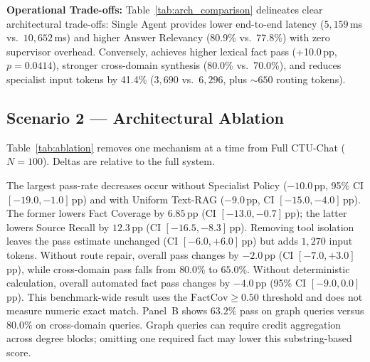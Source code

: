 \textbf{Operational Trade-offs:}
Table~\ref{tab:arch_comparison} delineates clear architectural trade-offs: Single Agent provides lower end-to-end latency ($5{,}159$\,ms vs.\ $10{,}652$\,ms) and higher Answer Relevancy (80.9\% vs.\ 77.8\%) with zero supervisor overhead. Conversely, \system{} achieves higher lexical fact pass (+10.0\,pp, $p{=}0.0414$), stronger cross-domain synthesis (80.0\% vs.\ 70.0\%), and reduces specialist input tokens by 41.4\% ($3{,}690$ vs.\ $6{,}296$, plus ${\sim}650$ routing tokens).

\subsection{Scenario 2 --- Architectural Ablation}
\label{sec:s2_results}

Table~\ref{tab:ablation} removes one mechanism at a time from Full CTU-Chat ($N{=}100$). Deltas are relative to the full system.

The largest pass-rate decreases occur without Specialist Policy ($-10.0$\,pp, 95\% CI $[-19.0, -1.0]$\,pp) and with Uniform Text-RAG ($-9.0$\,pp, CI $[-15.0, -4.0]$\,pp). The former lowers Fact Coverage by $6.85$\,pp (CI $[-13.0, -0.7]$\,pp); the latter lowers Source Recall by $12.3$\,pp (CI $[-16.5, -8.3]$\,pp). Removing tool isolation leaves the pass estimate unchanged (CI $[-6.0, +6.0]$\,pp) but adds $1{,}270$ input tokens. Without route repair, overall pass changes by $-2.0$\,pp (CI $[-7.0, +3.0]$\,pp), while cross-domain pass falls from $80.0\%$ to $65.0\%$. Without deterministic calculation, overall automated fact pass changes by $-4.0$\,pp (95\% CI $[-9.0, 0.0]$\,pp). This benchmark-wide result uses the $\text{FactCov} \ge 0.50$ threshold and does not measure numeric exact match. Panel~B shows $63.2\%$ pass on graph queries versus $80.0\%$ on cross-domain queries. Graph queries can require credit aggregation across degree blocks; omitting one required fact may lower this substring-based score.

